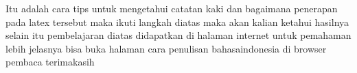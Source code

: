 \noindent Itu adalah cara tips untuk mengetahui catatan kaki dan bagaimana penerapan pada latex tersebut maka ikuti langkah diatas maka akan kalian ketahui hasilnya selain itu pembelajaran diatas didapatkan di halaman internet untuk pemahaman lebih jelasnya bisa buka halaman cara penulisan bahasaindonesia di browser pembaca terimakasih\par

